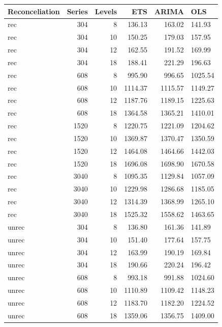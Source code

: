 \documentclass[11pt,a4paper,]{article}
\let\origtable\table
\let\endorigtable\endtable
\renewenvironment{table}[1][2] {
    \expandafter\origtable\expandafter[!htbp]
} {
    \endorigtable
}
\begin{document}
\begin{table}[!h]

\caption{\label{tab:TourismdatasimfixlevelNS}Mean(RMSE) on 8, 10, 12 and 18 levels of hierarchy with 304, 608, 1520 and 3040 number of bottom level series for ETS, ARIMA and OLS with and without reconciliation - two years forecast points with 0.5 error value - Fixed origin - Simulated tourism dataset}
\centering
\begin{tabular}[t]{lrrrrl}
\toprule
Reconceliation & Series & Levels & ETS & ARIMA & OLS\\
\midrule
rec & 304 & 8 & 136.13 & 163.02 & 141.93\\
rec & 304 & 10 & 150.25 & 179.03 & 157.95\\
rec & 304 & 12 & 162.55 & 191.52 & 169.99\\
rec & 304 & 18 & 188.41 & 221.29 & 196.63\\
rec & 608 & 8 & 995.90 & 996.65 & 1025.54\\
rec & 608 & 10 & 1114.37 & 1115.57 & 1149.27\\
rec & 608 & 12 & 1187.76 & 1189.15 & 1225.63\\
rec & 608 & 18 & 1364.58 & 1365.21 & 1410.01\\
rec & 1520 & 8 & 1220.75 & 1221.09 & 1204.62\\
rec & 1520 & 10 & 1369.87 & 1370.47 & 1350.59\\
rec & 1520 & 12 & 1464.08 & 1464.66 & 1442.03\\
rec & 1520 & 18 & 1696.08 & 1698.90 & 1670.58\\
rec & 3040 & 8 & 1095.35 & 1129.84 & 1057.09\\
rec & 3040 & 10 & 1229.98 & 1286.68 & 1185.05\\
rec & 3040 & 12 & 1314.39 & 1368.99 & 1265.10\\
rec & 3040 & 18 & 1525.32 & 1558.62 & 1463.65\\
unrec & 304 & 8 & 136.80 & 161.36 & 141.89\\
unrec & 304 & 10 & 151.40 & 177.64 & 157.75\\
unrec & 304 & 12 & 163.99 & 190.19 & 169.84\\
unrec & 304 & 18 & 190.66 & 220.24 & 196.42\\
unrec & 608 & 8 & 993.18 & 991.88 & 1024.60\\
unrec & 608 & 10 & 1110.89 & 1109.42 & 1148.23\\
unrec & 608 & 12 & 1183.70 & 1182.20 & 1224.52\\
unrec & 608 & 18 & 1359.06 & 1356.75 & 1409.00\\

\end{tabular}
\end{table}
\end{document}
